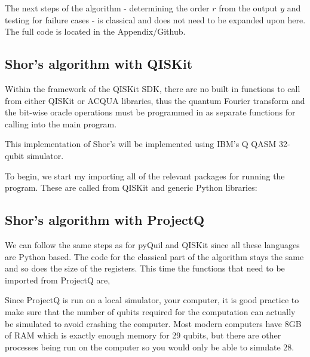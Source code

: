 The next steps of the algorithm - determining the order $r$ from the output $y$ and testing for failure cases - is classical and does not need to be expanded upon here. The full code is located in the Appendix/Github.

\subsection{Shor's algorithm with QISKit}

Within the framework of the QISKit SDK, there are no built in functions to call from either QISKit or ACQUA libraries, thus the quantum Fourier transform and the bit-wise oracle operations must be programmed in as separate functions for calling into the main program.

This implementation of Shor's will be implemented using IBM's Q QASM 32-qubit simulator.

To begin, we start my importing all of the relevant packages for running the program. These are called from QISKit and generic Python libraries:




\subsection{Shor's algorithm with ProjectQ}

We can follow the same steps as for pyQuil and QISKit since all these languages are Python based. The code for the classical part of the algorithm stays the same and so does the size of the registers. This time the functions that need to be imported from ProjectQ are,



Since ProjectQ is run on a local simulator, your computer, it is good practice to make sure that the number of qubits required for the computation can actually be simulated to avoid crashing the computer. Most modern computers have 8GB of RAM which is exactly enough memory for 29 qubits, but there are other processes being run on the computer so you would only be able to simulate 28.



